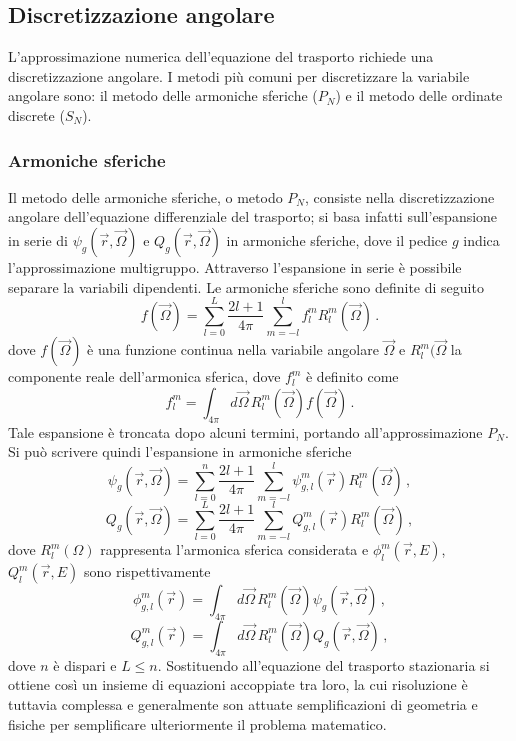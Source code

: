 \subsection{Discretizzazione angolare}
L'approssimazione numerica dell'equazione del trasporto richiede una 
discretizzazione angolare. I metodi più comuni per discretizzare la variabile 
angolare sono: il metodo delle armoniche sferiche ($P_N$) e il metodo delle 
ordinate discrete ($S_N$).


\subsubsection{Armoniche sferiche}

Il metodo delle armoniche sferiche, o metodo $P_N$, consiste nella 
discretizzazione angolare dell'equazione differenziale del trasporto; si basa 
infatti sull'espansione in serie di $\psi_g(\vec{r},\vec{\Omega})$ e 
$Q_g(\vec{r},\vec{\Omega})$ in armoniche sferiche, dove il pedice $g$ indica 
l'approssimazione multigruppo. Attraverso l'espansione in serie è possibile 
separare la variabili dipendenti. Le armoniche sferiche sono definite di 
seguito
\begin{equation}
f(\vec{\Omega})=\sum_{l=0}^L \frac{2l+1}{4\pi} \sum_{m=-l}^l f_l^m 
R_l^m(\vec{\Omega}) \,.
\end{equation}
dove $f(\vec{\Omega})$ è una funzione continua nella variabile angolare 
$\vec{\Omega}$ e $R_l^m(\vec{\Omega}$ la componente reale dell'armonica sferica, 
dove $f_l^m$ è definito come 
\begin{equation}
f_l^m=\int_{4\pi}d\vec{\Omega}\, R_l^m(\vec{\Omega}) f(\vec{\Omega}) \,.
\end{equation}
Tale espansione è troncata dopo alcuni termini, portando all'approssimazione 
$P_N$. Si può scrivere quindi l'espansione in armoniche sferiche
\begin{equation}
\psi_g(\vec{r},\vec{\Omega})=\sum_{l=0}^n \frac{2l+1}{4\pi}\sum_{m=-l}^l 
\psi_{g,l}^m(\vec{r})R_l^m(\vec{\Omega}) \,,
\end{equation}
\begin{equation}
Q_g(\vec{r},\vec{\Omega})=\sum_{l=0}^L\frac{2l+1}{4\pi}\sum_{m=-l}^l 
Q_{g,l}^m(\vec{r})R_l^m(\vec{\Omega}) \,,
\end{equation}
dove $R_l^m(\Omega)$ rappresenta l'armonica sferica considerata e 
$\phi_l^m(\vec{r},E)$, $Q_l^m(\vec{r},E)$ sono rispettivamente
\begin{equation}
\phi_{g,l}^m(\vec{r})= \int_{4\pi}d\vec{\Omega}\, 
R_l^m(\vec{\Omega})\psi_g(\vec{r},\vec{\Omega}) \,,
\end{equation}
\begin{equation}
Q_{g,l}^m(\vec{r})= \int_{4\pi}d\vec{\Omega}\, 
R_l^m(\vec{\Omega})Q_g(\vec{r},\vec{\Omega}) \,,
\end{equation}
dove $n$ è dispari e $L\leq n$. 
Sostituendo all'equazione del trasporto stazionaria si ottiene così un insieme 
di equazioni accoppiate tra loro, la cui risoluzione è tuttavia complessa e 
generalmente son attuate semplificazioni di geometria e fisiche per semplificare 
ulteriormente il problema matematico.

